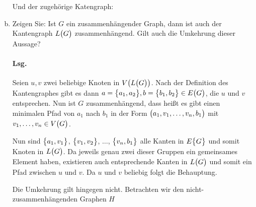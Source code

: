 \documentclass{scrreprt}
\begin{document}
\begin{enumerate}[(a)]
\begin{minipage}{0.45\textwidth}
  \end{minipage}
  \begin{minipage}{0.45\textwidth}
    Und der zugehörige Katengraph:

  \end{minipage}

\item Zeigen Sie: Ist $G$ ein zusammenhängender Graph, dann ist auch der
  Kantengraph $L\qty\big(G)$ zusammenhängend.
  Gilt auch die Umkehrung dieser Aussage?

  \paragraph{Lsg.} Seien $u, v$ zwei beliebige Knoten in $V\qty(L\qty\big(G))$.
  Nach der Definition des Kantengraphes gibt es dann
  $a = \qty\big{a_1, a_2}, b = \qty\big{b_1, b_2} \in E\qty\big(G)$, die $u$ und
  $v$ entsprechen.
  Nun ist $G$ zusammenhängend, dass heißt es gibt einen minimalen Pfad von $a_1$
  nach $b_1$ in der Form $\qty\big(a_1, v_1, \ldots, v_n, b_1)$ mit
  $v_1, \ldots, v_n \in V\qty\big(G)$.

  Nun sind $\qty\big{a_1, v_1}$, $\qty\big{v_1, v_2}$, $\ldots$,
  $\qty\big{v_n, b_1}$ alle Kanten in $E\qty\big{G}$ und somit Knoten in
  $L\qty\big(G)$.
  Da jeweils genau zwei dieser Gruppen ein gemeinsames Element haben, existieren
  auch entsprechende Kanten in $L\qty\big(G)$ und somit ein Pfad zwischen $u$
  und $v$.
  Da $u$ und $v$ beliebig folgt die Behauptung.

  Die Umkehrung gilt hingegen nicht.
  Betrachten wir den nicht-zusammenhängenden Graphen $H$

\end{enumerate}
\end{document}
